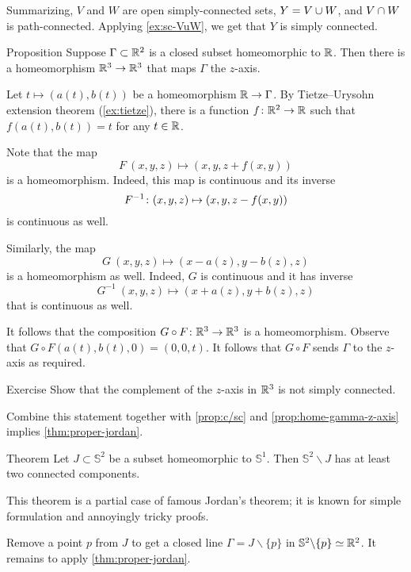Summarizing, $V$ and $W$ are open simply-connected sets, $Y=V\z\cup W$, and $V\z\cap W$ is path-connected.
Applying \ref{ex:sc-VuW}, we get that $Y$ is simply connected.
\qeds

\begin{thm}{Proposition}\label{prop:home-gamma-z-axis}
Suppose $\Gamma\subset\mathbb{R}^2$ is a closed subset homeomorphic to $\mathbb{R}$.
Then there is a homeomorphism $\mathbb{R}^3\to \mathbb{R}^3$ that maps $\Gamma$ the $z$-axis.
\end{thm}

Let $t\mapsto (a(t),b(t))$ be a homeomorphism $\mathbb{R}\to \Gamma$.
By Tietze--Urysohn extension theorem (\ref{ex:tietze}), there is a function $f\colon\mathbb{R}^2\to\mathbb{R}$ such that 
$f(a(t),b(t))=t$ for any $t\in \mathbb{R}$.

Note that the map 
\[F\:(x,y,z)\mapsto (x,y,z+f(x,y))\] is a homeomorphism.
Indeed, this map is continuous and its inverse 
\[F^{-1}\:(x,y,z)\z\mapsto (x,y,z-f(x,y))\]
is continuous as well.

Similarly, the map 
\[G\:(x,y,z)\mapsto (x-a(z),y-b(z),z)\]
is a homeomorphism as well.
Indeed, $G$ is continuous and it has inverse 
\[G^{-1}\:(x,y,z)\mapsto (x+a(z),y+b(z),z)\]
that is continuous as well.

It follows that the composition $G\circ F\colon\mathbb{R}^3\to\mathbb{R}^3$ is a homeomorphism.
Observe that $G\circ F(a(t),b(t),0)=(0,0,t)$.
It follows that $G\circ F$ sends $\Gamma$ to the $z$-axis as required.
\qeds

\begin{thm}{Exercise}
Show that the complement of the $z$-axis in $\mathbb{R}^3$ is not simply connected.

Combine this statement together with \ref{prop:c/sc} and \ref{prop:home-gamma-z-axis} implies \ref{thm:proper-jordan}.
\end{thm}

\begin{thm}{Theorem}
Let $J\subset\mathbb{S}^2$ be a subset homeomorphic to $\mathbb{S}^1$.
Then $\mathbb{S}^2\backslash J$ has at least two connected components. 
\end{thm}

This theorem is a partial case of famous Jordan's theorem;
it is known for simple formulation and annoyingly tricky proofs.

Remove a point $p$ from $J$ to get a closed line $\Gamma=J\backslash\{p\}$ in $ \mathbb{S}^2\backslash\{p\}\simeq\mathbb{R}^2$.
It remains to apply \ref{thm:proper-jordan}.
\qeds
